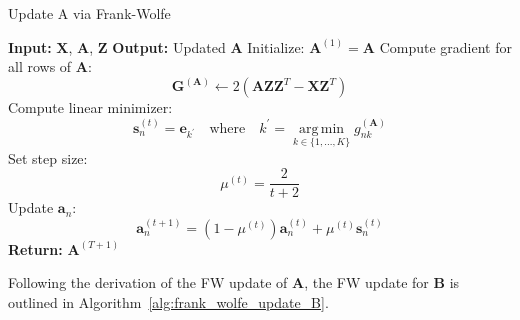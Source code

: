 \documentclass[oneside]{article}
\begin{document}
\begin{algorithm}[H]
    \caption{Update A via Frank-Wolfe}
    \label{alg:frank_wolfe_update_A}
    \begin{algorithmic}[1]
    \State \textbf{Input:} $\mathbf{X}$, $\mathbf{A}$, $\mathbf{Z}$
    \State \textbf{Output:} Updated $\mathbf{A}$
    \State Initialize: $\mathbf{A}^{(1)} = \mathbf{A}$
        \State Compute gradient for all rows of $\mathbf{A}$:
        \begin{equation}
        \mathbf{G}^{(\mathbf{A})} \gets 2 \left( \mathbf{A} \mathbf{Z} \mathbf{Z}^T - \mathbf{X} \mathbf{Z}^T \right)
        \end{equation}
            \State Compute linear minimizer:
            \begin{equation}
            \mathbf{s}_n^{(t)} = \mathbf{e}_{k^\prime} \quad \text{where} \quad k^\prime = \operatorname*{arg\,min}_{ k \in \{1, ..., K\} } g_{nk}^{(\mathbf{A})}
            \end{equation}
            \State Set step size:
            \begin{equation}
            \mu^{(t)} = \frac{2}{t+2}
            \end{equation}
            \State Update $\mathbf{a}_n$:
            \begin{equation}
            \mathbf{a}_n^{(t+1)} = (1-\mu^{(t)}) \mathbf{a}_n^{(t)} + \mu^{(t)} \mathbf{s}_n^{(t)}
            \end{equation}
        \EndFor
    \EndFor
    \State \textbf{Return:} $\mathbf{A}^{(T+1)}$
    \end{algorithmic}
\end{algorithm}

Following the derivation of the FW update of $\mathbf{A}$, the FW update for $\mathbf{B}$ is outlined in Algorithm~\ref{alg:frank_wolfe_update_B}.
\end{document}
